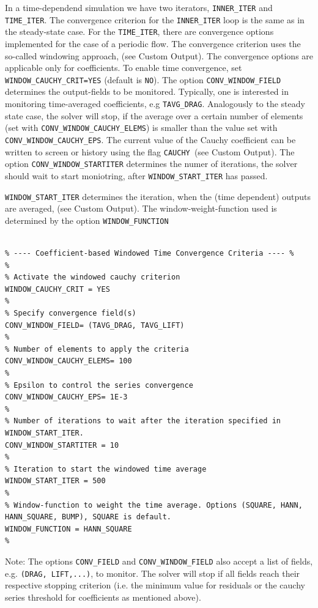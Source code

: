 \documentclass[12pt, a4paper, twoside]{article}
\begin{document}
In a time-dependend simulation we have two iterators, \verb|INNER_ITER| and \verb|TIME_ITER|. The convergence criterion for the \verb|INNER_ITER| loop is the same as in the steady-state case. For the \verb|TIME_ITER|, there are convergence options implemented for the case of a periodic flow. The convergence criterion uses the so-called windowing approach, (see Custom Output). The convergence options are applicable only for coefficients. To enable time convergence, set \verb|WINDOW_CAUCHY_CRIT=YES| (default is \verb|NO|). The option \verb|CONV_WINDOW_FIELD| determines the output-fields to be monitored. Typically, one is interested in monitoring time-averaged coefficients, e.g \verb|TAVG_DRAG|. Analogously to the steady state case, the solver will stop, if the average over a certain number of elements (set with \verb|CONV_WINDOW_CAUCHY_ELEMS|) is smaller than the value set with \verb|CONV_WINDOW_CAUCHY_EPS|. The current value of the Cauchy coefficient can be written to screen or history using the flag \verb|CAUCHY |(see Custom Output). The option \verb|CONV_WINDOW_STARTITER| determines the numer of iterations, the solver should wait to start moniotring, after \verb|WINDOW_START_ITER| has passed.

\texttt{WINDOW\_START\_ITER} determines the iteration, when the (time dependent) outputs are averaged, (see Custom Output). The window-weight-function used is determined by the option \verb|WINDOW_FUNCTION|


\begin{lstlisting}

% ---- Coefficient-based Windowed Time Convergence Criteria ---- %
%
% Activate the windowed cauchy criterion
WINDOW_CAUCHY_CRIT = YES
%
% Specify convergence field(s)
CONV_WINDOW_FIELD= (TAVG_DRAG, TAVG_LIFT)
%
% Number of elements to apply the criteria
CONV_WINDOW_CAUCHY_ELEMS= 100
%
% Epsilon to control the series convergence
CONV_WINDOW_CAUCHY_EPS= 1E-3
%
% Number of iterations to wait after the iteration specified in  WINDOW_START_ITER.
CONV_WINDOW_STARTITER = 10
%
% Iteration to start the windowed time average
WINDOW_START_ITER = 500
%
% Window-function to weight the time average. Options (SQUARE, HANN, HANN_SQUARE, BUMP), SQUARE is default.
WINDOW_FUNCTION = HANN_SQUARE
%

\end{lstlisting}

Note: The options \verb|CONV_FIELD| and \verb|CONV_WINDOW_FIELD| also accept a list of fields, e.g. \verb|(DRAG, LIFT,...)|, to monitor. The solver will stop if all fields reach their respective stopping criterion (i.e. the minimum value for residuals or the cauchy series threshold for coefficients as mentioned above).
\end{document}
